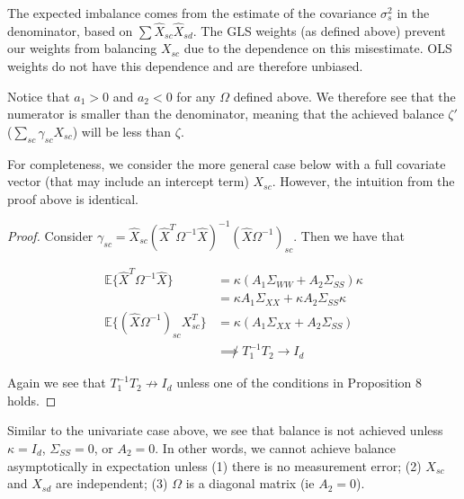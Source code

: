 \begin{remark}
    The expected imbalance comes from the estimate of the covariance $\sigma^2_s$ in the denominator, based on $\sum \hat{X}_{sc}\hat{X}_{sd}$. The GLS weights (as defined above) prevent our weights from balancing $X_{sc}$ due to the dependence on this misestimate. OLS weights do not have this dependence and are therefore unbiased.
\end{remark}

\begin{remark}
    Notice that $a_1 > 0$ and $a_2 < 0$ for any $\Omega$ defined above. We therefore see that the numerator is smaller than the denominator, meaning that the achieved balance $\zeta'$ ($\sum_{sc}\gamma_{sc}X_{sc}$) will be less than $\zeta$.
\end{remark}

For completeness, we consider the more general case below with a full covariate vector (that may include an intercept term) $X_{sc}$. However, the intuition from the proof above is identical.

\begin{proof}
    Consider $\gamma_{sc} = \hat{X}_{sc}(\hat{X}^T\Omega^{-1}\hat{X})^{-1}(\hat{X}\Omega^{-1})_{sc}$. Then we have that
    
    \begin{align*}
        \mathbb{E}\{\hat{X}^T\Omega^{-1}\hat{X}\} &= 
        \kappa(A_1\Sigma_{WW} + A_2\Sigma_{SS})\kappa \\
        &= \kappa A_1\Sigma_{XX} + \kappa A_2\Sigma_{SS} \kappa \\
        \mathbb{E}\{(\hat{X}\Omega^{-1})_{sc}X_{sc}^T\} &= \kappa(A_1\Sigma_{XX} + A_2\Sigma_{SS}) \\
        &\not\implies T_1^{-1}T_2 \to I_d
    \end{align*}
    
    Again we see that $T_1^{-1}T_2 \not\to I_d$ unless one of the conditions in Proposition 8 holds.
\end{proof}

\begin{remark}
Similar to the univariate case above, we see that balance is not achieved unless $\kappa = I_d$, $\Sigma_{SS} = 0$, or $A_2 = 0$. In other words, we cannot achieve balance asymptotically in expectation unless (1) there is no measurement error; (2) $X_{sc}$ and $X_{sd}$ are independent; (3) $\Omega$ is a diagonal matrix (ie $A_2 = 0$).
\end{remark}

